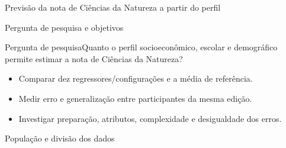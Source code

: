 

\begin{frame}\titlepage\centering\textcolor{verde}{Previsão da nota de Ciências da Natureza a partir do perfil}\end{frame}
\begin{frame}{Pergunta de pesquisa e objetivos}
\begin{block}{Pergunta de pesquisa}Quanto o perfil socioeconômico, escolar e demográfico permite estimar a nota de Ciências da Natureza?\end{block}
\begin{itemize}\item Comparar dez regressores/configurações e a média de referência.
\item Medir erro e generalização entre participantes da mesma edição.
\item Investigar preparação, atributos, complexidade e desigualdade dos erros.
\end{itemize}
\end{frame}
\begin{frame}{População e divisão dos dados}
\end{frame}
